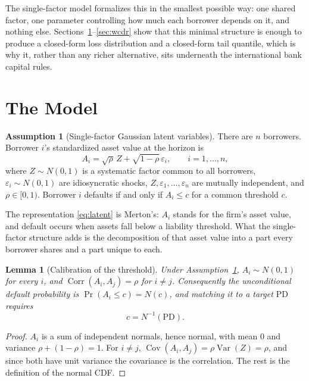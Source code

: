 \documentclass[11pt]{article}
\newtheorem{lemma}{Lemma}
\theoremstyle{remark}
\theoremstyle{definition}
\newtheorem{assumption}{Assumption}
\begin{document}
The single-factor model formalizes this in the smallest possible way: one shared factor, one parameter controlling how much each borrower depends on it, and nothing else. Sections~\ref{sec:model}--\ref{sec:wcdr} show that this minimal structure is enough to produce a closed-form loss distribution and a closed-form tail quantile, which is why it, rather than any richer alternative, sits underneath the international bank capital rules.

\section{The Model}
\label{sec:model}

\begin{assumption}[Single-factor Gaussian latent variables]
\label{ass:model}
There are $n$ borrowers. Borrower $i$'s standardized asset value at the horizon is
\begin{equation}
\label{eq:latent}
A_i = \sqrt{\rho}\,Z + \sqrt{1-\rho}\,\varepsilon_i, \qquad i = 1,\dots,n,
\end{equation}
where $Z \sim N(0,1)$ is a systematic factor common to all borrowers, $\varepsilon_i \sim N(0,1)$ are idiosyncratic shocks, $Z, \varepsilon_1,\dots,\varepsilon_n$ are mutually independent, and $\rho \in [0,1)$. Borrower $i$ defaults if and only if $A_i \le c$ for a common threshold $c$.
\end{assumption}

The representation \eqref{eq:latent} is Merton's: $A_i$ stands for the firm's asset value, and default occurs when assets fall below a liability threshold. What the single-factor structure adds is the decomposition of that asset value into a part every borrower shares and a part unique to each.

\begin{lemma}[Calibration of the threshold]
\label{lem:threshold}
Under Assumption~\ref{ass:model}, $A_i \sim N(0,1)$ for every $i$, and $\operatorname{Corr}(A_i, A_j) = \rho$ for $i \ne j$. Consequently the unconditional default probability is $\Pr(A_i \le c) = N(c)$, and matching it to a target $\text{PD}$ requires
\begin{equation}
\label{eq:threshold}
c = N^{-1}(\text{PD}).
\end{equation}
\end{lemma}

\begin{proof}
$A_i$ is a sum of independent normals, hence normal, with mean $0$ and variance $\rho + (1-\rho) = 1$. For $i \ne j$, $\operatorname{Cov}(A_i,A_j) = \rho\operatorname{Var}(Z) = \rho$, and since both have unit variance the covariance is the correlation. The rest is the definition of the normal CDF.
\end{proof}
\end{document}
